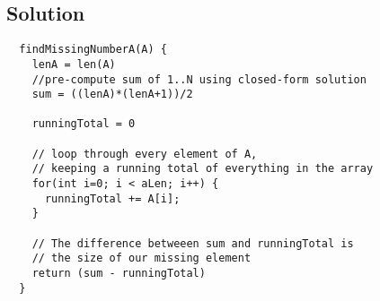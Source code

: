 \subsection*{Solution}

\begin{verbatim}
  findMissingNumberA(A) {
    lenA = len(A)
    //pre-compute sum of 1..N using closed-form solution
    sum = ((lenA)*(lenA+1))/2

    runningTotal = 0

    // loop through every element of A, 
    // keeping a running total of everything in the array
    for(int i=0; i < aLen; i++) {
      runningTotal += A[i];
    }

    // The difference betweeen sum and runningTotal is
    // the size of our missing element
    return (sum - runningTotal)
  }
\end{verbatim}
